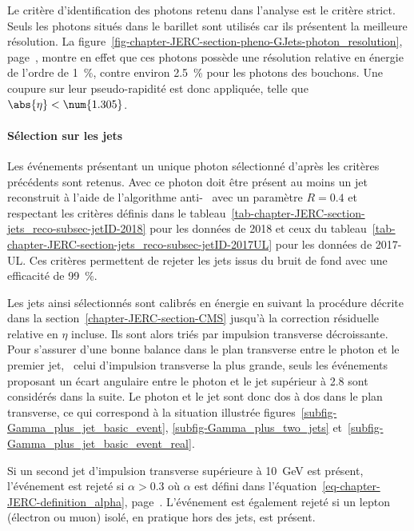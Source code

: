 \par Le critère d'identification des photons retenu dans l'analyse est le critère strict.
Seuls les photons situés dans le barillet sont utilisés car ils présentent la meilleure résolution.
La figure~\ref{fig-chapter-JERC-section-pheno-GJets-photon_resolution}, page~\pageref{fig-chapter-JERC-section-pheno-GJets-photon_resolution}, montre en effet que ces photons possède une résolution relative en énergie de l'ordre de \SI{1}{\%}, contre environ \SI{2.5}{\%} pour les photons des bouchons.
Une coupure sur leur pseudo-rapidité est donc appliquée, telle que $\abs{\eta} < \num{1.305}$.
\par {}
\paragraph{Sélection sur les jets}
Les événements présentant un unique photon sélectionné d'après les critères précédents sont retenus.
Avec ce photon doit être présent au moins un jet reconstruit à l'aide de l'algorithme anti-\kT~\cite{Cacciari_antikT} avec un paramètre $R=\num{0.4}$ et respectant les critères définis dans le tableau~\ref{tab-chapter-JERC-section-jets_reco-subsec-jetID-2018} pour les données de 2018 et ceux du tableau~\ref{tab-chapter-JERC-section-jets_reco-subsec-jetID-2017UL} pour les données de 2017-UL.
Ces critères permettent de rejeter les jets issus du bruit de fond avec une efficacité de \SI{99}{\%}.
\par Les jets ainsi sélectionnés sont calibrés en énergie en suivant la procédure décrite dans la section~\ref{chapter-JERC-section-CMS} jusqu'à la correction résiduelle relative en $\eta$ incluse. Ils sont alors triés par impulsion transverse décroissante.
Pour s'assurer d'une bonne balance dans le plan transverse entre le photon et le premier jet, \ie\ celui d'impulsion transverse la plus grande, seuls les événements proposant un écart angulaire entre le photon et le jet supérieur à \SI{2.8}{\rad} sont considérés dans la suite.
Le photon et le jet sont donc dos à dos dans le plan transverse, ce qui correspond à la situation illustrée figures~\ref{subfig-Gamma_plus_jet_basic_event}, \ref{subfig-Gamma_plus_two_jets} et~\ref{subfig-Gamma_plus_jet_basic_event_real}.
\par Si un second jet d'impulsion transverse supérieure à \SI{10}{\GeV} est présent, l'événement est rejeté si $\alpha>\num{0.3}$ où $\alpha$ est défini dans l'équation~\eqref{eq-chapter-JERC-definition_alpha}, page~\pageref{eq-chapter-JERC-definition_alpha}.
L'événement est également rejeté si un lepton (électron ou muon) isolé, en pratique hors des jets, est présent.
\par {}
